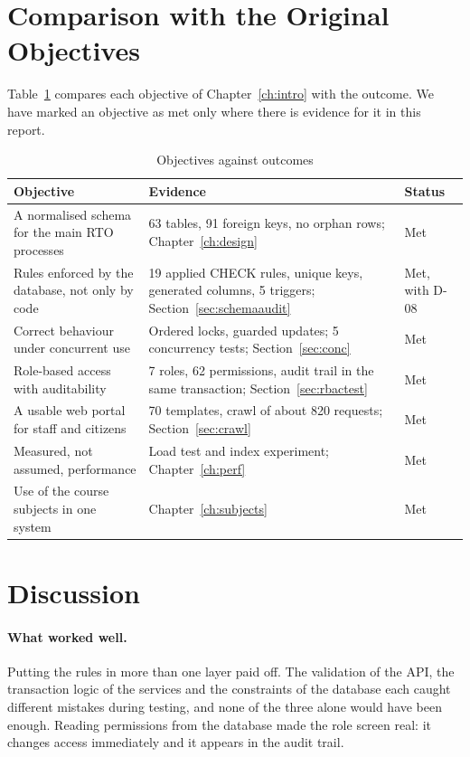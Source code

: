 \section{Comparison with the Original Objectives}
Table~\ref{tab:objectives} compares each objective of Chapter~\ref{ch:intro} with the
outcome. We have marked an objective as met only where there is evidence for it in this
report.

\begin{table}[H]
\centering\small
\caption{Objectives against outcomes}\label{tab:objectives}
\begin{tabularx}{\linewidth}{@{}p{4.4cm}Xp{1.8cm}@{}}
\toprule \textbf{Objective} & \textbf{Evidence} & \textbf{Status}\\ \midrule
A normalised schema for the main RTO processes & 63 tables, 91 foreign keys, no orphan rows; Chapter~\ref{ch:design} & Met\\
Rules enforced by the database, not only by code & 19 applied CHECK rules, unique keys, generated columns, 5 triggers; Section~\ref{sec:schemaaudit} & Met, with D-08\\
Correct behaviour under concurrent use & Ordered locks, guarded updates; 5 concurrency tests; Section~\ref{sec:conc} & Met\\
Role-based access with auditability & 7 roles, 62 permissions, audit trail in the same transaction; Section~\ref{sec:rbactest} & Met\\
A usable web portal for staff and citizens & 70 templates, crawl of about 820 requests; Section~\ref{sec:crawl} & Met\\
Measured, not assumed, performance & Load test and index experiment; Chapter~\ref{ch:perf} & Met\\
Use of the course subjects in one system & Chapter~\ref{ch:subjects} & Met\\
\bottomrule
\end{tabularx}
\end{table}

\section{Discussion}
\paragraph{What worked well.} Putting the rules in more than one layer paid off. The
validation of the API, the transaction logic of the services and the constraints of the
database each caught different mistakes during testing, and none of the three alone would
have been enough. Reading permissions from the database made the role screen real: it
changes access immediately and it appears in the audit trail.

